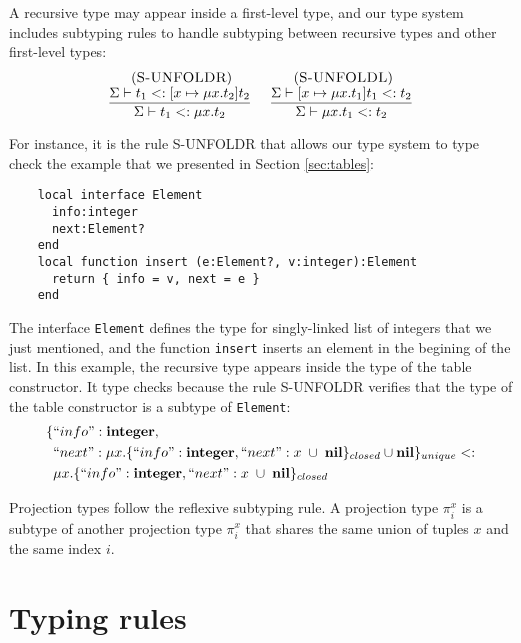 A recursive type may appear inside a first-level type, and our
type system includes subtyping rules to handle subtyping between
recursive types and other first-level types:
\[
\begin{array}{c}
\begin{array}{c}
\; (\textsc{S-UNFOLDR})\\
\dfrac{\Sigma \vdash t_{1} <: [x \mapsto \mu x.t_{2}]t_{2}}
      {\Sigma \vdash t_{1} <: \mu x.t_{2}}
\end{array}
\;
\begin{array}{c}
\; (\textsc{S-UNFOLDL})\\
\dfrac{\Sigma \vdash [x \mapsto \mu x.t_{1}]t_{1} <: t_{2}}
      {\Sigma \vdash \mu x.t_{1} <: t_{2}}
\end{array}
\end{array}
\]

For instance, it is the rule \textsc{S-UNFOLDR} that allows our
type system to type check the example that we presented
in Section \ref{sec:tables}:
\begin{verbatim}
    local interface Element
      info:integer
      next:Element?
    end
    local function insert (e:Element?, v:integer):Element
      return { info = v, next = e }
    end
\end{verbatim}

The interface \texttt{Element} defines the type for singly-linked
list of integers that we just mentioned, and the function
\texttt{insert} inserts an element in the begining of the list.
In this example, the recursive type appears inside the type of
the table constructor.
It type checks because the rule \textsc{S-UNFOLDR} verifies that
the type of the table constructor is a subtype of \texttt{Element}:
\begin{align*}
\{ & ``info":\mathbf{integer}, \\
   & ``next":\mu x.\{``info":\mathbf{integer}, ``next":x \;\cup\; \mathbf{nil}\}_{closed} \cup \mathbf{nil} \}_{unique} <: \\
& \mu x.\{``info":\mathbf{integer}, ``next":x \;\cup\; \mathbf{nil}\}_{closed}
\end{align*}

Projection types follow the reflexive subtyping rule.
A projection type $\pi_{i}^{x}$ is a subtype of another projection type $\pi_{i}^{x}$
that shares the same union of tuples $x$ and the same index $i$.

\section{Typing rules}
\label{sec:rules}

